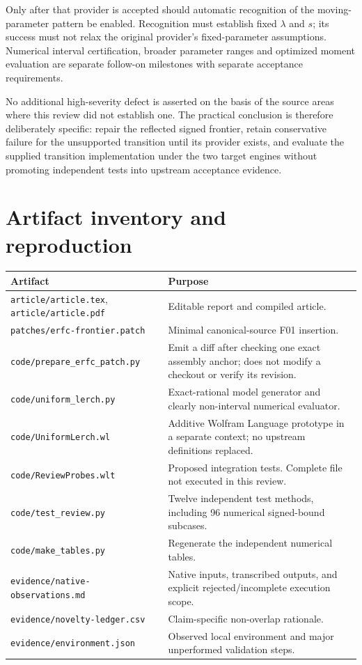 \documentclass[11pt,a4paper]{article}
\begin{document}
Only after that provider is accepted should automatic recognition of the
moving-parameter pattern be enabled. Recognition must establish fixed
$\lambda$ and $s$; its success must not relax the original provider's
fixed-parameter assumptions. Numerical interval certification, broader
parameter ranges and optimized moment evaluation are separate follow-on
milestones with separate acceptance requirements.

No additional high-severity defect is asserted on the basis of the source
areas where this review did not establish one. The practical conclusion is
therefore deliberately specific: repair the reflected signed frontier, retain
conservative failure for the unsupported transition until its provider exists,
and evaluate the supplied transition implementation under the two target
engines without promoting independent tests into upstream acceptance evidence.

\appendix
\section{Artifact inventory and reproduction}

\begin{longtable}{@{}p{}p{}@{}}
\toprule
Artifact & Purpose\\
\midrule\endhead
\nolinkurl{article/article.tex}, \nolinkurl{article/article.pdf} & Editable report
and compiled article.\\[4pt]
\nolinkurl{patches/erfc-frontier.patch} & Minimal canonical-source F01 insertion.\\[4pt]
\nolinkurl{code/prepare_erfc_patch.py} & Emit a diff after checking one exact
assembly anchor; does not modify a checkout or verify its revision.\\[4pt]
\nolinkurl{code/uniform_lerch.py} & Exact-rational model generator and clearly
non-interval numerical evaluator.\\[4pt]
\nolinkurl{code/UniformLerch.wl} & Additive Wolfram Language prototype in a
separate context; no upstream definitions replaced.\\[4pt]
\nolinkurl{code/ReviewProbes.wlt} & Proposed integration tests. Complete file
not executed in this review.\\[4pt]
\nolinkurl{code/test_review.py} & Twelve independent test methods, including
96 numerical signed-bound subcases.\\[4pt]
\nolinkurl{code/make_tables.py} & Regenerate the independent numerical tables.\\[4pt]
\nolinkurl{evidence/native-observations.md} & Native inputs, transcribed outputs,
and explicit rejected/incomplete execution scope.\\[4pt]
\nolinkurl{evidence/novelty-ledger.csv} & Claim-specific non-overlap rationale.\\[4pt]
\nolinkurl{evidence/environment.json} & Observed local environment and major
unperformed validation steps.\\
\bottomrule
\end{longtable}
\end{document}
